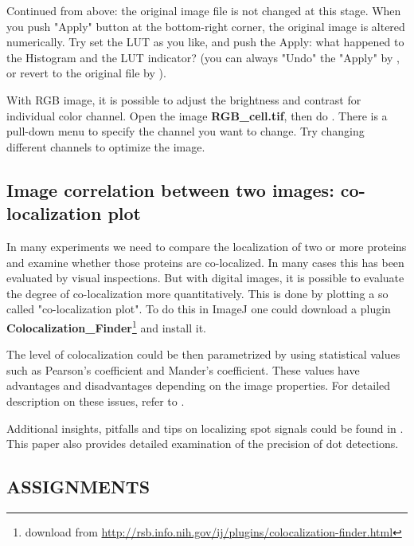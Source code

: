 \begin{indentexercise}{2}
Continued from above: the original image file
is not changed at this stage. When you push
"Apply" button at the bottom-right
corner, the original image is altered numerically. Try set the LUT as
you like, and push the Apply: what happened to the Histogram and the
LUT indicator? (you can always
"Undo" the "Apply" by , 
or revert to the original file by ).
\end{indentexercise}

\begin{indentexercise}{3}
With RGB image, it is possible to adjust the
brightness and contrast for individual color channel. Open the image
\textbf{RGB\_cell.tif}, then do . 
There is a pull-down menu to specify
the channel you want to change. Try changing different channels to
optimize the image. 
\end{indentexercise}

\subsection{Image correlation between two images: co-localization plot}

In many experiments we need to compare the
localization of two or more proteins and examine whether those proteins
are co-localized. In many cases this has been evaluated by visual
inspections. But with digital images, it is possible to evaluate the
degree of co-localization more quantitatively. This is done by plotting
a so called "co-localization
plot". To do this in ImageJ one could download a
plugin \textbf{Colocalization\_Finder}\footnote{download from \url{http://rsb.info.nih.gov/ij/plugins/colocalization-finder.html}}
and install it.

The level of colocalization could be then parametrized by using statistical
values such as Pearson's coefficient and
Mander's coefficient. These values have advantages and
disadvantages depending on the image properties. For detailed
description on these issues, refer to \citet*{BolteJM2006}.

Additional insights, pitfalls and tips on localizing spot signals could
be found in \citet{Waters2009}. This paper also provides detailed examination of the precision of dot detections. 
\clearpage

\subsection{ASSIGNMENTS}

